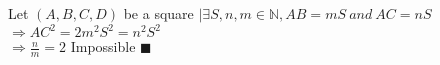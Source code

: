 \documentclass{article}
\begin{document}
\noindent Let $(A, B, C, D)$ be a square  $|\exists S, n, m \in \mathbb{N} ,
AB  = mS \ and \ AC = nS$\\
$\Rightarrow AC^2 = 2m^2S^2 = n^2S^2$\\
$\Rightarrow \frac{n}{m} = 2$ Impossible $\blacksquare$
\end{document}
